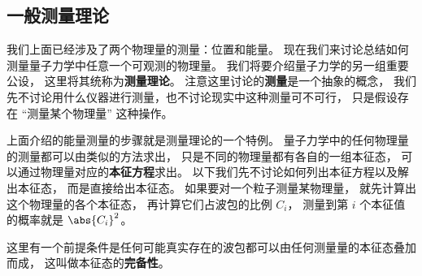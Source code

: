 \subsection{一般测量理论}
我们上面已经涉及了两个物理量的测量：位置和能量。 现在我们来讨论总结如何测量量子力学中任意一个可观测的物理量。 我们将要介绍量子力学的另一组重要公设， 这里将其统称为\textbf{测量理论}。 注意这里讨论的\textbf{测量}是一个抽象的概念， 我们先不讨论用什么仪器进行测量，也不讨论现实中这种测量可不可行， 只是假设存在 “测量某个物理量” 这种操作。

上面介绍的能量测量的步骤就是测量理论的一个特例。 量子力学中的任何物理量的测量都可以由类似的方法求出， 只是不同的物理量都有各自的一组本征态， 可以通过物理量对应的\textbf{本征方程}求出。 以下我们先不讨论如何列出本征方程以及解出本征态， 而是直接给出本征态。 如果要对一个粒子测量某物理量， 就先计算出这个物理量的各个本征态， 再计算它们占波包的比例 $C_i$， 测量到第 $i$ 个本征值的概率就是 $\abs{C_i}^2$。

这里有一个前提条件是任何可能真实存在的波包都可以由任何测量量的本征态叠加而成， 这叫做本征态的\textbf{完备性}。

